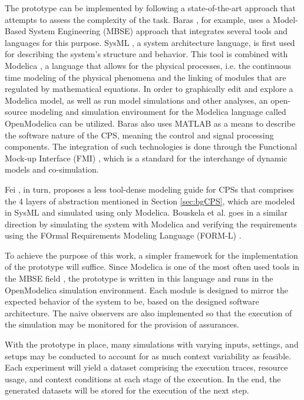 The prototype can be implemented by following a state-of-the-art approach that attempts to assess the complexity of the task. Baras \cite{baras2019formal}, for example, uses a Model-Based System Engineering (MBSE) approach that integrates several tools and languages for this purpose. SysML \cite{balestrini2015object}, a system architecture language, is first used for describing the system's structure and behavior. This tool is combined with Modelica \cite{Modelica}, a language that allows for the physical processes, i.e. the continuous time modeling of the physical phenomena and the linking of modules that are regulated by mathematical equations. In order to graphically edit and explore a Modelica model, as well as run model simulations and other analyses, an open-source modeling and simulation environment for the Modelica language called OpenModelica \cite{OpenModelica} can be utilized. Baras also uses MATLAB \cite{higham2016matlab} as a means to describe the software nature of the CPS, meaning the control and signal processing components. The integration of such technologies is done through the Functional Mock-up Interface (FMI) \cite{blochwitz2011functional}, which is a standard for the interchange of dynamic models and co-simulation.

Fei \cite{deng2019modeling}, in turn, proposes a less tool-dense modeling guide for CPSs that comprises the 4 layers of abstraction mentioned in Section \ref{sec:bgCPS}, which are modeled in SysML and simulated using only Modelica. Bouskela et al. \cite{bouskela2022formal} goes in a similar direction by simulating the system with Modelica and verifying the requirements using the FOrmal Requirements Modeling Language (FORM-L) \cite{nguyen2014form}.


To achieve the purpose of this work, a simpler framework for the implementation of the prototype will suffice. Since Modelica is one of the most often used tools in the MBSE field \cite{mohamed2021model}, the prototype is written in this language and runs in the OpenModelica simulation environment. Each module is designed to mirror the expected behavior of the system to be, based on the designed software architecture. The naive observers are also implemented so that the execution of the simulation may be monitored for the provision of assurances.

With the prototype in place, many simulations with varying inputs, settings, and setups may be conducted to account for as much context variability as feasible. Each experiment will yield a dataset comprising the execution traces, resource usage, and context conditions at each stage of the execution. In the end, the generated datasets will be stored for the execution of the next step.



